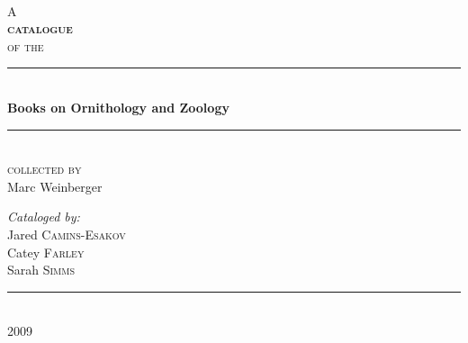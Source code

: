 \begin{titlepage}
 
\begin{center}
 
 
~\\[1cm]
{\small A}\\[0.5cm]

\textsc{\huge\bfseries catalogue}\\[0.5cm]
 
\textsc{\small of the}\\[0.5cm]
 
 
\rule{\linewidth}{0.5mm}\\[0.4cm]
{ \huge \bfseries Books on Ornithology and Zoology}\\[0.4cm]

\rule{\linewidth}{0.5mm}\\[0.5cm]

\textsc{\small collected by}\\[0.5cm]

{\selectfont\LARGE Marc Weinberger}\\[1.5cm]
 
\begin{flushleft} \large
\emph{Cataloged by:}\\
Jared \textsc{Camins-Esakov}\\
Catey \textsc{Farley}\\
Sarah \textsc{Simms}\\
\end{flushleft}
 
\vfill
 
\rule{6cm}{0.25mm}\\[0.2cm]

{\large 2009}
 
\end{center}
 
\end{titlepage}

